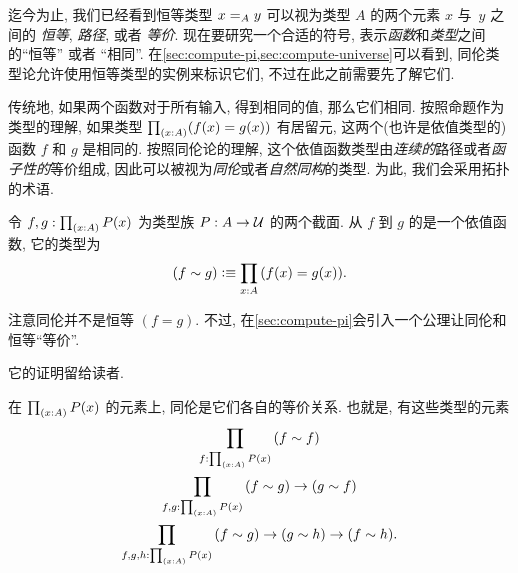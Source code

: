 %

迄今为止, 我们已经看到恒等类型 $\id[A]xy$ 可以视为类型 $A$ 的两个元素 $x$ 与~$y$ 之间的 \emph{恒等}, \emph{路径}, 或者 \emph{等价}.
现在要研究一个合适的符号, 表示\emph{函数}和\emph{类型}之间的``恒等'' 或者 ``相同''.
在\cref{sec:compute-pi,sec:compute-universe}可以看到, 同伦类型论允许使用恒等类型的实例来标识它们, 不过在此之前需要先了解它们.

传统地, 如果两个函数对于所有输入, 得到相同的值, 那么它们相同.
按照命题作为类型的理解, 如果类型 $\prd{x:A} (f(x)=g(x))$ 有居留元, 这两个(也许是依值类型的)函数 $f$ 和 $g$ 是相同的.
按照同伦论的理解, 这个依值函数类型由\emph{连续的}路径或者\emph{函子性的}等价组成, 因此可以被视为\emph{同伦}或者\emph{自然同构}的类型.
为此, 我们会采用拓扑的术语.

\begin{defn}
    \label{defn:homotopy}
    令 $f,g:\prd{x:A} P(x)$ 为类型族 $P:A\to\type$ 的两个截面.
    从 $f$ 到 $g$ 的是一个依值函数, 它的类型为
    \begin{equation*}
    (f\htpy g)
        \defeq \prd{x:A} (f(x)=g(x)).
    \end{equation*}
\end{defn}

注意同伦并不是恒等 $(f=g)$.
不过, 在\cref{sec:compute-pi}会引入一个公理让同伦和恒等``等价''.

它的证明留给读者.

\begin{lem}
    \label{lem:homotopy-props}
    在 $\prd{x:A} P(x)$ 的元素上, 同伦是它们各自的等价关系.
    也就是, 有这些类型的元素
    \begin{gather*}
        \prd{f:\prd{x:A} P(x)} (f\htpy f)\\
        \prd{f,g:\prd{x:A} P(x)} (f\htpy g) \to (g\htpy f)\\
        \prd{f,g,h:\prd{x:A} P(x)} (f\htpy g) \to (g\htpy h) \to (f\htpy h).
    \end{gather*}
\end{lem}


